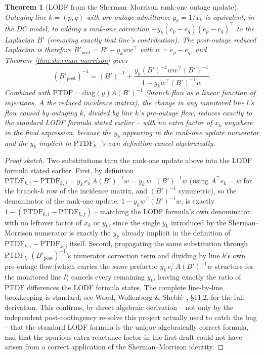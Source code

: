 \documentclass[11pt]{report}
\theoremstyle{plain}
\newtheorem{theorem}{Theorem}[chapter]
\theoremstyle{definition}
\theoremstyle{remark}
\begin{document}
\begin{theorem}[LODF from the Sherman--Morrison rank-one outage update]
\label{thm:lodf-derivation}
Outaging line $k=(p,q)$ with pre-outage admittance $y_k=1/x_k$ is
equivalent, in the DC model, to adding a rank-one correction
$-y_k(e_p-e_q)(e_p-e_q)^\top$ to the Laplacian $B'$ (removing exactly
that line's contribution). The post-outage reduced Laplacian is
therefore $B'_{\text{post}}=B'-y_k ww^\top$ with $w=e_p-e_q$, and
Theorem~\ref{thm:sherman-morrison} gives
\begin{equation}
(B'_{\text{post}})^{-1} = (B')^{-1} + \frac{y_k(B')^{-1}ww^\top(B')^{-1}}{1-y_kw^\top(B')^{-1}w}.
\label{eq:lodf-sm}
\end{equation}
Combined with $\text{PTDF}=\text{diag}(y)A(B')^{-1}$ (branch flow as
a linear function of injections, $A$ the reduced incidence matrix), the
change in any monitored line $l$'s flow caused by outaging $k$, divided
by line $k$'s pre-outage flow, reduces exactly to the standard LODF
formula stated earlier
-- with \emph{no} extra factor of $x_k$ anywhere in the final expression,
because the $y_k$ appearing in the rank-one update numerator and the
$y_k$ implicit in $\text{PTDF}_{k,\cdot}$'s own definition cancel
algebraically.
\end{theorem}
\begin{proof}[Proof sketch]
Two substitutions turn the rank-one update above into the LODF formula
stated earlier. First,
by definition $\text{PTDF}_{k,i}-\text{PTDF}_{k,j}=y_k\,e_k^\top
A(B')^{-1}w=y_k\,w^\top(B')^{-1}w$ (using $A^\top e_k=w$ for the branch-$k$
row of the incidence matrix, and $(B')^{-1}$ symmetric), so the
denominator of the rank-one update, $1-y_kw^\top(B')^{-1}w$, is exactly
$1-(\text{PTDF}_{k,i}-\text{PTDF}_{k,j})$ -- matching
the LODF formula's own denominator with no leftover factor of $x_k$ or
$y_k$, since the single $y_k$ introduced by the Sherman--Morrison
numerator is exactly the $y_k$ already implicit in the definition of
$\text{PTDF}_{k,i}-\text{PTDF}_{k,j}$ itself. Second, propagating
the same substitution through $\text{PTDF}_{l,\cdot}
(B'_{\text{post}})^{-1}$'s numerator correction term and dividing by
line $k$'s own pre-outage flow (which carries the \emph{same} prefactor
$y_k\,e_l^\top A(B')^{-1}w$ structure for the monitored line $l$)
cancels every remaining $y_k$, leaving exactly the ratio of
$\text{PTDF}$ differences the LODF formula states. The complete
line-by-line bookkeeping is standard; see Wood, Wollenberg \&
Sheblé~\cite{woodwollenberg}, \S11.2, for the full derivation. This
confirms, by direct algebraic derivation -- not only by the independent
post-contingency re-solve this project actually used to catch the bug
-- that the standard LODF formula is the unique algebraically correct formula,
and that the spurious extra reactance factor in the first draft could
not have arisen from a correct application of the Sherman--Morrison
identity.
\end{proof}
\end{document}

